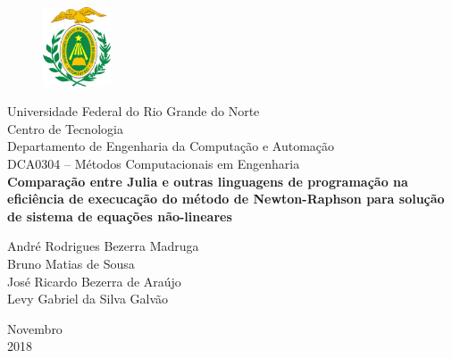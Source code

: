 \documentclass[a4paper, 12pt, openright, oneside]{article}
\begin{document}
\onehalfspacing
\begin{titlepage}
	\begin{center}
	
	\begin{figure}[!ht]
	\centering
	\includegraphics[width=2cm]{./ufrn.jpg}
	\end{figure}
		Universidade Federal do Rio Grande do Norte\\
		Centro de Tecnologia\\
		Departamento de Engenharia da Computação e Automação\\
		DCA0304 -- Métodos Computacionais em Engenharia\\
		\vspace{15pt}
        \vspace{95pt}
        \textbf{\large{Comparação entre Julia e outras linguagens de programação na eficiência de execucação do método de Newton-Raphson para solução de sistema de equações não-lineares}}\\
		\vspace{3,5cm}
	\end{center}
	
	\begin{flushright}
			\item André Rodrigues Bezerra Madruga \\
			Bruno Matias de Sousa \\
			José Ricardo Bezerra de Araújo \\
			Levy Gabriel da Silva Galvão \\
 	\end{flushright}
	\vspace{1cm}
	
	\begin{center}
		\vspace{\fill}
		Novembro\\2018
	\end{center}
\end{titlepage}

\end{document}
